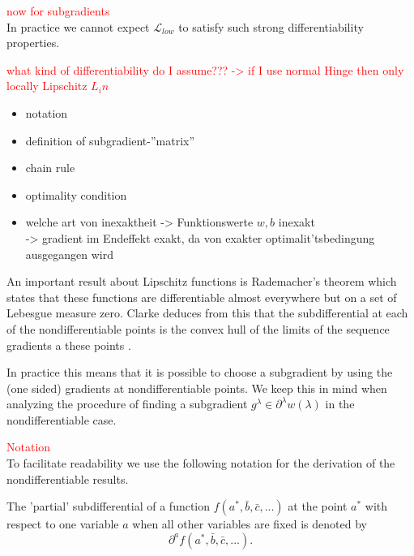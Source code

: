 \textcolor{red}{now for subgradients} \\

In practice we cannot expect \(\mathcal{L}_{low}\) to satisfy such strong differentiability properties.

\textcolor{red}{what kind of differentiability do I assume??? -> if I use normal Hinge then only locally Lipschitz $L_in$}

\begin{itemize}
	\item notation
	\item definition of subgradient-''matrix''
	\item chain rule
	\item optimality condition
\end{itemize}

\begin{itemize}
	\item welche art von inexaktheit -> Funktionswerte \(w,b\) inexakt\\
	-> gradient im Endeffekt exakt, da von exakter optimalit'tsbedingung ausgegangen wird
\end{itemize}

An important result about Lipschitz functions is Rademacher's theorem which states that these functions are differentiable almost everywhere but on a set of Lebesgue measure zero\cite[Theorem 3.1]{Heinonen2004}. 
Clarke deduces from this that the subdifferential at each of the nondifferentiable points is the convex hull of the limits of the sequence gradients a these points \cite[see Theorem 2.5.1]{Clarke1990}.

In practice this means that it is possible to choose a subgradient by using the (one sided) gradients at nondifferentiable points.
We keep this in mind when analyzing the procedure of finding a subgradient \( g^{\lambda} \in \partial^{\lambda} w(\lambda)\) in the nondifferentiable case.

\textcolor{red}{Notation}\\

To facilitate readability we use the following notation for the derivation of the nondifferentiable results.

The 'partial' subdifferential of a function \(f(a^*,\bar{b},\bar{c},...)\) at the point \(a^*\) with respect to one variable \(a\) when all other variables are fixed is denoted by 
\begin{equation*}
	\partial^{a} f(a^*,\bar{b},\bar{c},...).
\end{equation*}

